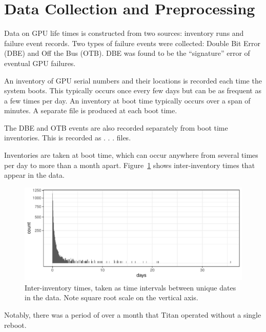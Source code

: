 \section{Data Collection and Preprocessing}
\label{section:dataprep}

Data on GPU life times is constructed from two sources: inventory runs
and failure event records. Two types of failure events were collected:
Double Bit Error (DBE) and Off the Bus (OTB). DBE was found to be the
``signature'' error of eventual GPU failures.

An inventory of GPU serial numbers and their locations is recorded
each time the system boots.  This typically occurs once every few days but
can be as frequent as a few times per day. An inventory at boot time
typically occurs over a span of  minutes. A separate file is
produced at each boot time.

The DBE and OTB events are also recorded separately from boot
time inventories. This is recorded as . . . files.

Inventories are taken at boot time, which can occur anywhere from
several times per day to more than a month
apart. Figure~\ref{fig:inventory} shows inter-inventory times that
appear in the data.
\begin{figure}[bt]
  \begin{center}
    \includegraphics[width=\columnwidth]{figs/attention_intervals001.pdf}
  \end{center}
  \caption{Inter-inventory times, taken as time intervals between
    unique dates in the data. Note square root scale on the vertical
    axis.}
  \label{fig:inventory}
\end{figure}
Notably, there was a period of over a month that Titan operated
without a single reboot.

